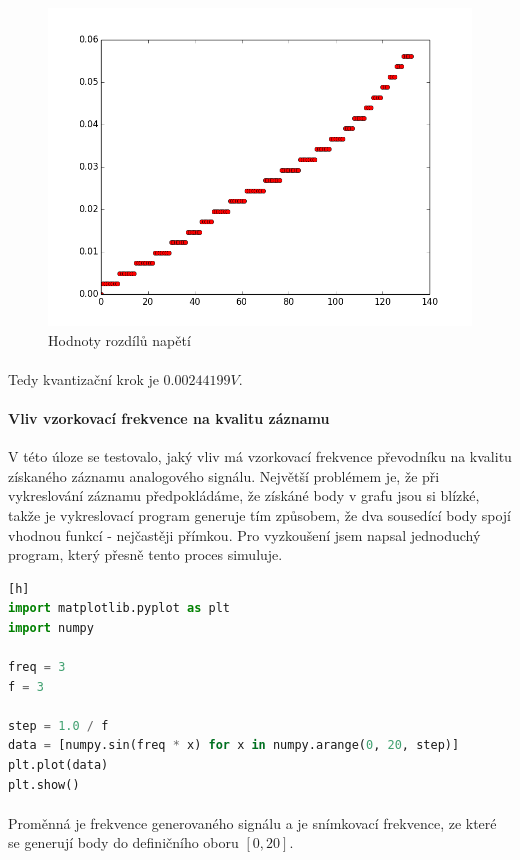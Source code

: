 \documentclass[a4paper,11pt]{article}
\begin{document}
    \begin{figure}[h]
        \centering
        \includegraphics[width=0.6\linewidth]{diffs.png}
        \caption{Hodnoty rozdílů napětí}
    \end{figure}

    \paragraph{} Tedy kvantizační krok je $0.00244199V$.

    \paragraph{Vliv vzorkovací frekvence na kvalitu záznamu} V této úloze se testovalo, jaký vliv 
    má vzorkovací frekvence převodníku na kvalitu získaného záznamu analogového signálu. Největší
    problémem je, že při vykreslování záznamu předpokládáme, že získáné body v grafu jsou si blízké,
    takže je vykreslovací program generuje tím způsobem, že dva sousedící body spojí vhodnou funkcí
    - nejčastěji přímkou. Pro vyzkoušení jsem napsal jednoduchý program, který přesně tento proces
    simuluje. 

\begin{lstlisting}[language=Python][h]
import matplotlib.pyplot as plt
import numpy

freq = 3
f = 3

step = 1.0 / f
data = [numpy.sin(freq * x) for x in numpy.arange(0, 20, step)]
plt.plot(data)
plt.show()\end{lstlisting} 

    \paragraph{} Proměnná  je frekvence generovaného signálu a  je
    snímkovací frekvence, ze které se generují body do definičního oboru $[0, 20]$.
\end{document}
